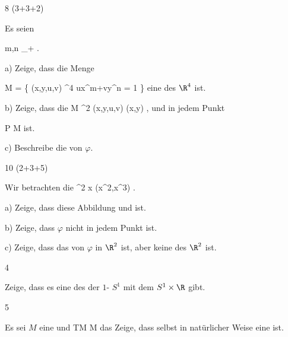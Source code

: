 {8 (3+3+2)}
{

Es seien

\mavergleichskette
{\vergleichskette
{ m,n
}
{ \in }{\N_+
}
{  }{
}
{    }{
}
{   }{
}
}
{}{}{.}

a) Zeige, dass die Menge

\mavergleichskettedisp
{\vergleichskette
{ M
}
{ =} { \left\{ (x,y,u,v) \in \R^4  \mid  ux^m+vy^n = 1         \right\}
}
{ } {
}
{ } {
}
{ } {
}
}
{}{}{}
eine
des $\R^4$ ist.

b) Zeige, dass die
\maabbeledisp {\varphi} { M } {\R^2
} {(x,y,u,v)} {(x,y)
} {,}
und in jedem Punkt

\mavergleichskette
{\vergleichskette
{ P
}
{ \in }{ M
}
{  }{
}
{    }{
}
{   }{
}
}
{}{}{}
ist.

c) Beschreibe die
von $\varphi$.

}
{} {}

{10 (2+3+5)}
{

Wir betrachten die
\maabbeledisp {\varphi} {\R} {\R^2
} { x } {(x^2,x^3)
} {.}

a) Zeige, dass diese Abbildung
und
ist.

b) Zeige, dass $\varphi$ nicht in jedem Punkt
ist.

c) Zeige, dass das
von $\varphi$
in $\R^2$ ist, aber keine
des $\R^2$ ist.

}
{} {}

{4}
{

Zeige, dass es eine
 des
 der
$1$- $S^1$ mit dem
 $S^1 \times \R$ gibt.

}
{} {}

{5}
{

Es sei $M$ eine
und
\maabbdisp {\pi} {TM} {M
} {}
das
Zeige, dass
 selbst in natürlicher Weise eine
ist.

}
{} {}

